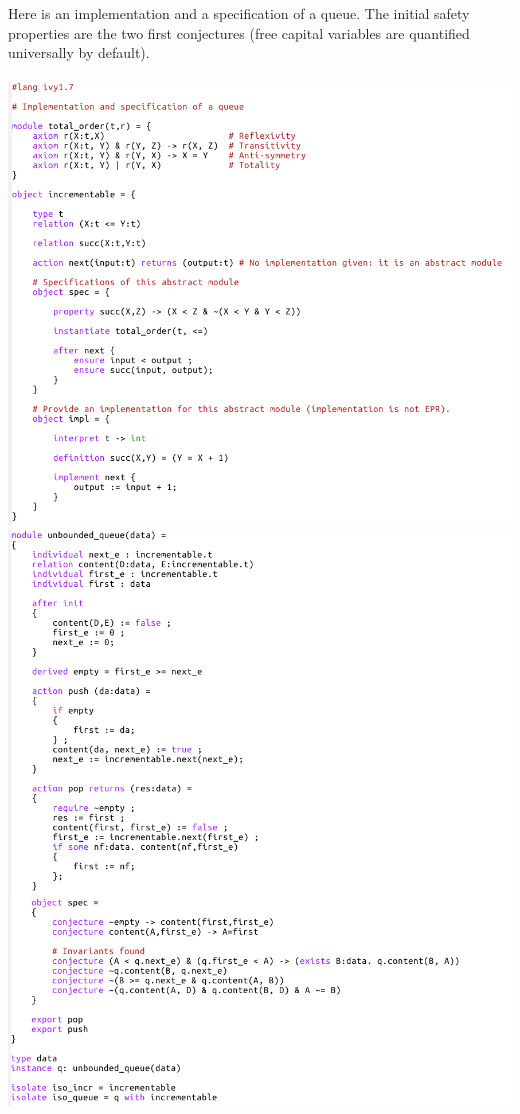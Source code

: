 \documentclass[11pt,a4paper,oldfontcommands,openany]{memoir}
\begin{document}
    Here is an implementation and a specification of a queue.
    The initial safety properties are the two first conjectures (free capital variables are quantified universally by default).\\\\
    \includegraphics[width=17cm]{Queue1}\\
    \includegraphics[width=17cm]{Queue2}\\
\end{document}
